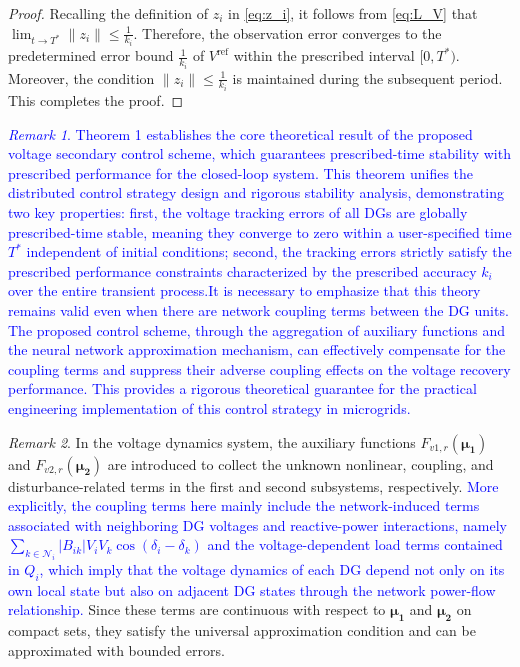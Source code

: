 \documentclass[]{interact}
\theoremstyle{plain}%
\theoremstyle{definition}
\theoremstyle{remark}
\newtheorem{remark}{Remark}
\begin{document}
\begin{proof}
Recalling the definition of $z_i$ in \eqref{eq:z_i}, it follows from \eqref{eq:L_V} that $\lim_{t \rightarrow T^*} \| z_i \| \le \frac{1}{k_i}$. Therefore, the observation error converges to the predetermined error bound $\frac{1}{k_i}$ of $V^{\text{ref}}$ within the prescribed interval $[0, T^*)$. Moreover, the condition $\| z_i \| \le \frac{1}{k_i}$ is maintained during the subsequent period. This completes the proof.
\end{proof}

\textcolor{blue}{\begin{remark}
Theorem 1 establishes the core theoretical result of the proposed voltage secondary control scheme, which guarantees prescribed-time stability with prescribed performance for the closed-loop system. This theorem unifies the distributed control strategy design and rigorous stability analysis, demonstrating two key properties: first, the voltage tracking errors of all DGs are globally prescribed-time stable, meaning they converge to zero within a user-specified time $T^{*}$ independent of initial conditions; second, the tracking errors strictly satisfy the prescribed performance constraints characterized by the prescribed accuracy $k_i$ over the entire transient process.It is necessary to emphasize that this theory remains valid even when there are network coupling terms between the DG units. The proposed control scheme, through the aggregation of auxiliary functions and the neural network approximation mechanism, can effectively compensate for the coupling terms and suppress their adverse coupling effects on the voltage recovery performance. This provides a rigorous theoretical guarantee for the practical engineering implementation of this control strategy in microgrids.
\end{remark}}

\begin{remark}
In the voltage dynamics system, the auxiliary functions $F_{v1,r}(\boldsymbol{\mu_1})$ and $F_{v2,r}(\boldsymbol{\mu_2})$ are introduced to collect the unknown nonlinear, coupling, and disturbance-related terms in the first and second subsystems, respectively. 
\textcolor{blue}{More explicitly, the coupling terms here mainly include the network-induced terms associated with neighboring DG voltages and reactive-power interactions, namely $\sum_{k \in \mathcal{N}_i} |B_{ik}|V_iV_k\cos(\delta_i-\delta_k)$ and the voltage-dependent load terms contained in $Q_i$, which imply that the voltage dynamics of each DG depend not only on its own local state but also on adjacent DG states through the network power-flow relationship.}
Since these terms are continuous with respect to $\boldsymbol{\mu_1}$ and $\boldsymbol{\mu_2}$ on compact sets, they satisfy the universal approximation condition and can be approximated with bounded errors.
\end{remark}
\end{document}
